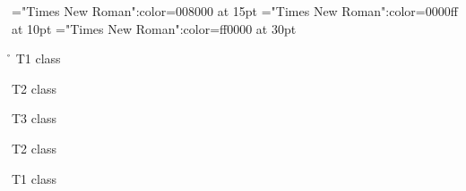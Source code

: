 \font\tctbta="Times New Roman":color=008000 at 15pt
\font\tbta="Times New Roman":color=0000ff at 10pt
\font\ta="Times New Roman":color=ff0000 at 30pt
 \r\n
\ta T1 class 

\tbta T2 class 

\tctbta T3 class 

\tbta T2 class 

\ta T1 class 


\bye

